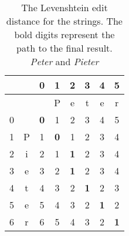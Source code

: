 \begin{table}
	\begin{center}
	\caption[Example of Levenshtein edit distance]{\label{tab:LD_example}The Levenshtein edit distance for the strings. The bold digits represent the path to the final result. \textit{Peter} and \textit{Pieter}}
	\vspace{0.5cm}
	\begin{tabular}{|c|*{7}{c|}}
		\toprule
		  &   & 0 & 1 & 2 & 3 & 4 & 5 \\ \hline
		  &   & \textvisiblespace & P & e & t & e & r \\ \hline
		0 & \textvisiblespace & \textbf{0} & 1 & 2 & 3 & 4 & 5 \\ \hline
		1 & P & 1 & \textbf{0} & 1 & 2 & 3 & 4\\ \hline
		2 & i & 2 & 1 & \textbf{1} & 2 & 3 & 4\\ \hline
		3 & e & 3 & 2 & \textbf{1} & 2 & 3 & 4\\ \hline
		4 & t & 4 & 3 & 2 & \textbf{1} & 2 & 3\\ \hline
		5 & e & 5 & 4 & 3 & 2 & \textbf{1} & 2\\ \hline
		6 & r & 6 & 5 & 4 & 3 & 2 & \textbf{1}\\ 
		\bottomrule
	\end{tabular}
	\end{center}
\end{table}
